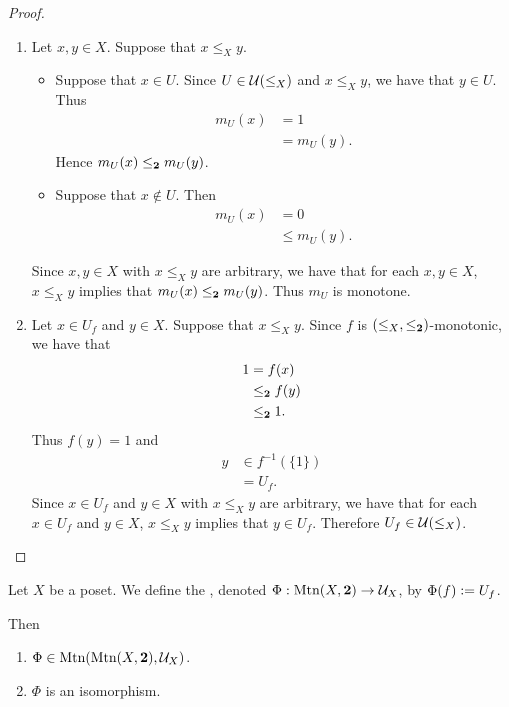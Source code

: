 \documentclass{book}
\begin{document}
	\begin{proof}\
		\begin{enumerate}
			\item Let $x,y \in X$. Suppose that $x \leq_X y$. 
			\begin{itemize}
				\item Suppose that $x \in U$. Since $U \in \mathcal{U}(\leq_X)$ and $x \leq_X y$, we have that $y \in U$. Thus 
				\begin{align*}
					m_U(x) 
					& = 1 \\
					& = m_U(y).
				\end{align*} 
				Hence $m_U(x) \leq_{\mathbf{2}} m_U(y)$. 
				\item Suppose that $x \not \in U$. Then 
				\begin{align*}
					m_U(x) 
					& = 0 \\
					& \leq m_U(y).
				\end{align*}
			\end{itemize}
			Since $x, y \in X$ with $x \leq_X y$ are arbitrary, we have that for each $x,y \in X$, $x \leq_X y$ implies that $m_U(x) \leq_{\mathbf{2}} m_U(y)$. Thus $m_U$ is monotone. 
			\item Let $x \in U_f$ and $y \in X$. Suppose that $x \leq_X y$. Since $f$ is $(\leq_X, \leq_{\mathbf{2}})$-monotonic, we have that 
			\begin{align*}
				1
				& = f(x) \\
				& \leq_{\mathbf{2}} f(y) \\
				& \leq_{\mathbf{2}} 1.
			\end{align*}
			Thus $f(y) = 1$ and 
			\begin{align*}
				y
				& \in f^{-1}(\{1\}) \\
				& = U_f.
			\end{align*}
			Since $x \in U_f$ and $y \in X$ with $x \leq_X y$ are arbitrary, we have that for each $x \in U_f$ and $y \in X$, $x \leq_X y$ implies that $y \in U_f$. Therefore $U_f \in \mathcal{U}(\leq_X)$. 
		\end{enumerate}
	\end{proof}
	
	\begin{defn} 
		Let $X$ be a poset. We define the , denoted $\Phi:\operatorname{\text{Mtn}}(X, \mathbf{2}) \rightarrow \mathcal{U}_X$, by $\Phi(f) \vcentcolon= U_f$.
	\end{defn}
	
	\begin{ex} 
		Then 
		\begin{enumerate}
			\item $\Phi \in \operatorname{\text{Mtn}}(\operatorname{\text{Mtn}}(X, \mathbf{2}), \mathcal{U}_X)$.
			\item $\Phi$ is an isomorphism.
		\end{enumerate}
	\end{ex}
	
\end{document}
